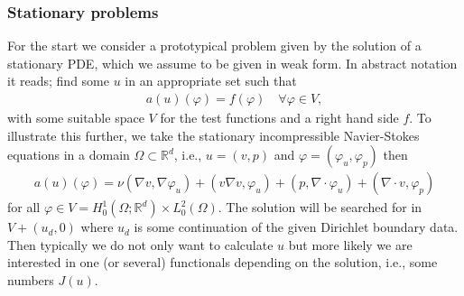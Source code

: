 \documentclass[prodmode,acmtoms]{acmsmall}
\numberwithin{equation}{section}
\newcommand{\R}{\mathbb{R}}
\renewcommand{\phi}{\varphi}
\begin{document}
\subsubsection{Stationary problems}
For the start we consider a prototypical problem given by the solution of 
a stationary PDE, which we assume to be given in weak form.
In abstract notation it reads; find some $u$ in an appropriate set
such that
\begin{align}\label{eq:prototype_weak}
a(u)(\phi) = f(\phi) \quad \forall \phi \in V,
\end{align}
with some suitable space $V$ for the test functions and a 
right hand side $f$.
To illustrate this further, we take the stationary 
incompressible Navier-Stokes equations in a domain $\Omega \subset \R^d$, 
i.e., $u = (v,p)$ and $\phi = (\phi_u,\phi_p)$ then
\begin{align}\label{eq:ns}
a(u)(\phi) = \nu(\nabla v, \nabla\phi_u) + (v \nabla v,\phi_u) + (p, \nabla \cdot \phi_u) + (\nabla \cdot v ,\phi_p)
\end{align}
for all $\phi \in V = H^1_0(\Omega;\R^d) \times L^2_0(\Omega)$.
The solution will be searched for in $V + (u_d,0)$ where $u_d$ is some 
continuation of the given Dirichlet boundary data.
Then typically we do not only want to calculate $u$ but more likely we are 
interested in one (or several) functionals depending on the solution, i.e., some numbers $J(u)$.
\end{document}
